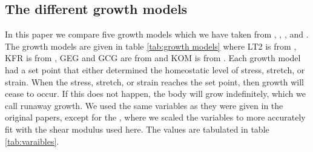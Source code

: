 \subsection{The different growth models}
\label{sub:different models}
In this paper we compare five growth models which we have taken from \cite{Taber1998}, \cite{Kroon2009}, \cite{Goktepe}, and \cite{Kerckhoffs2012}. The growth models are given in table \ref{tab:growth models} where LT2 is from \cite{Taber1998}, KFR is from \cite{Kroon2009}, GEG and GCG are from \citep{Goktepe} and KOM is from \cite{Kerckhoffs2012}. Each growth model had a set point that either determined the homeostatic level of stress, stretch, or strain. When the stress, stretch, or strain reaches the set point, then growth will cease to occur. If this does not happen, the body will grow indefinitely, which we call runaway growth. We used the same variables as they were given in the original papers, except for the , where we scaled the variables to more accurately fit with the shear modulus used here. The values are tabulated in table \ref{tab:varaibles}.
